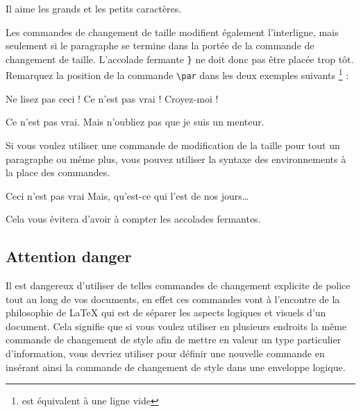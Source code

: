 \begin{example}
Il aime les  {\LARGE grands et  
{\small les petits} 
caractères}. 
\end{example}

Les commandes de changement de taille modifient également
l'interligne, mais seulement si le paragraphe se termine dans la
portée de la commande de changement de taille. L'accolade fermante
\verb|}| ne
doit donc pas être placée trop tôt. Remarquez la position de la
commande \verb|\par| dans les deux exemples suivants 
\footnote{ est équivalent à une ligne vide} :

\begin{example}
{\Large Ne lisez pas ceci !
 Ce n'est pas vrai !
 Croyez-moi !\par}
\end{example}
\begin{example}
{\Large Ce n'est pas vrai. Mais
n'oubliez pas que je suis un
menteur.}\par
\end{example}

Si vous voulez utiliser une commande de modification de la taille pour
tout un paragraphe ou même plus, vous pouvez utiliser la syntaxe des
environnements à la place des commandes. 

\begin{example}
\begin{Large} \raggedright
Ceci n'est pas vrai
Mais, qu'est-ce qui l'est
de nos jours\dots\par
\end{Large}
\end{example}

\noindent Cela vous évitera d'avoir à compter les accolades
fermantes. 

\subsection{Attention danger}

Il est dangereux d'utiliser de telles commandes de changement
explicite de police tout au long de vos documents, en effet ces
commandes vont à l'encontre de la philosophie de \LaTeX{} qui est de
séparer les aspects logiques et visuels d'un document. Cela signifie
que si vous voulez utiliser en plusieurs endroits la même commande de
changement de style afin de mettre en valeur un type particulier
\vadjust{\pagebreak[3]}%
d'information, vous devriez utiliser  pour définir une
nouvelle commande en insérant ainsi la commande de changement de style
dans une enveloppe logique.

